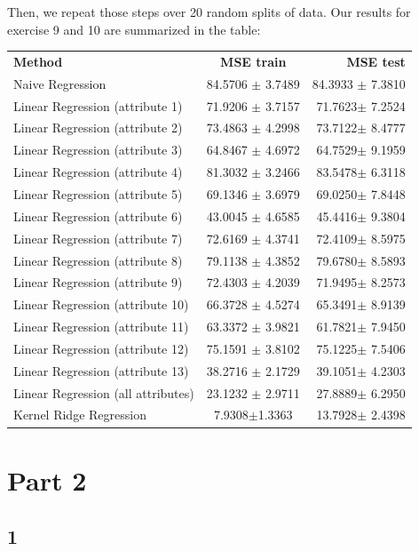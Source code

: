 \documentclass{article} %
\begin{document}
Then, we repeat those steps over 20 random splits of data. Our results for exercise 9 and 10 are summarized in the table:
\begin{center}
\begin{tabular}{|  l c r|}
  \hline
  \textbf{Method} & \textbf{MSE train} & \textbf{MSE test} \\
  Naive Regression & 84.5706 $ \pm $ 3.7489 & 84.3933 $ \pm $ 7.3810\\
 Linear Regression (attribute 1) & 71.9206 $ \pm $ 3.7157& 71.7623$ \pm $ 7.2524\\
  Linear Regression (attribute 2) & 73.4863 $ \pm $ 4.2998& 73.7122$ \pm $ 8.4777\\
 Linear Regression (attribute 3) & 64.8467 $ \pm $ 4.6972& 64.7529$ \pm $ 9.1959\\
 Linear Regression (attribute 4) & 81.3032 $ \pm $ 3.2466& 83.5478$ \pm $ 6.3118 \\
 Linear Regression (attribute 5) & 69.1346 $ \pm $ 3.6979& 69.0250$ \pm $ 7.8448\\
 Linear Regression (attribute 6) & 43.0045 $ \pm $ 4.6585& 45.4416$ \pm $ 9.3804\\
 Linear Regression (attribute 7) & 72.6169 $ \pm $ 4.3741& 72.4109$ \pm $ 8.5975\\
 Linear Regression (attribute 8) & 79.1138 $ \pm $ 4.3852& 79.6780$ \pm $ 8.5893\\
 Linear Regression (attribute 9) & 72.4303 $ \pm $ 4.2039& 71.9495$ \pm $ 8.2573\\
 Linear Regression (attribute 10) & 66.3728 $ \pm $ 4.5274& 65.3491$ \pm $ 8.9139\\
 Linear Regression (attribute 11) & 63.3372 $ \pm $ 3.9821& 61.7821$ \pm $ 7.9450\\
 Linear Regression (attribute 12) & 75.1591 $ \pm $ 3.8102& 75.1225$ \pm $ 7.5406\\
  Linear Regression (attribute 13) & 38.2716 $ \pm $ 2.1729& 39.1051$ \pm $ 4.2303\\
  Linear Regression (all attributes) & 23.1232 $ \pm $ 2.9711& 27.8889$ \pm $ 6.2950\\
 Kernel Ridge Regression  & 7.9308$ \pm $1.3363 & 13.7928$ \pm$ 2.4398\\
  \hline
\end{tabular}
 \label{fig:res}
\end{center}

\section*{Part 2}
\subsection*{1}
\end{document}
